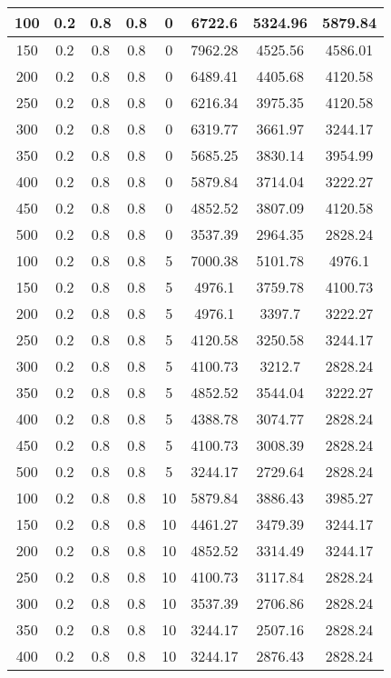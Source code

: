 \documentclass[a4paper, 12pt]{extreport}
\begin{document}
\begin{itemize}
\begin{longtable}{|c|c|c|c|c|c|c|c|}
			100 & 0.2 & 0.8 & 0.8 & 0 & 6722.6 & 5324.96 & 5879.84 \\\hline
			150 & 0.2 & 0.8 & 0.8 & 0 & 7962.28 & 4525.56 & 4586.01 \\\hline
			200 & 0.2 & 0.8 & 0.8 & 0 & 6489.41 & 4405.68 & 4120.58 \\\hline
			250 & 0.2 & 0.8 & 0.8 & 0 & 6216.34 & 3975.35 & 4120.58 \\\hline
			300 & 0.2 & 0.8 & 0.8 & 0 & 6319.77 & 3661.97 & 3244.17 \\\hline
			350 & 0.2 & 0.8 & 0.8 & 0 & 5685.25 & 3830.14 & 3954.99 \\\hline
			400 & 0.2 & 0.8 & 0.8 & 0 & 5879.84 & 3714.04 & 3222.27 \\\hline
			450 & 0.2 & 0.8 & 0.8 & 0 & 4852.52 & 3807.09 & 4120.58 \\\hline
			500 & 0.2 & 0.8 & 0.8 & 0 & 3537.39 & 2964.35 & 2828.24 \\\hline
			100 & 0.2 & 0.8 & 0.8 & 5 & 7000.38 & 5101.78 & 4976.1 \\\hline
			150 & 0.2 & 0.8 & 0.8 & 5 & 4976.1 & 3759.78 & 4100.73 \\\hline
			200 & 0.2 & 0.8 & 0.8 & 5 & 4976.1 & 3397.7 & 3222.27 \\\hline
			250 & 0.2 & 0.8 & 0.8 & 5 & 4120.58 & 3250.58 & 3244.17 \\\hline
			300 & 0.2 & 0.8 & 0.8 & 5 & 4100.73 & 3212.7 & 2828.24 \\\hline
			350 & 0.2 & 0.8 & 0.8 & 5 & 4852.52 & 3544.04 & 3222.27 \\\hline
			400 & 0.2 & 0.8 & 0.8 & 5 & 4388.78 & 3074.77 & 2828.24 \\\hline
			450 & 0.2 & 0.8 & 0.8 & 5 & 4100.73 & 3008.39 & 2828.24 \\\hline
			500 & 0.2 & 0.8 & 0.8 & 5 & 3244.17 & 2729.64 & 2828.24 \\\hline
			100 & 0.2 & 0.8 & 0.8 & 10 & 5879.84 & 3886.43 & 3985.27 \\\hline
			150 & 0.2 & 0.8 & 0.8 & 10 & 4461.27 & 3479.39 & 3244.17 \\\hline
			200 & 0.2 & 0.8 & 0.8 & 10 & 4852.52 & 3314.49 & 3244.17 \\\hline
			250 & 0.2 & 0.8 & 0.8 & 10 & 4100.73 & 3117.84 & 2828.24 \\\hline
			300 & 0.2 & 0.8 & 0.8 & 10 & 3537.39 & 2706.86 & 2828.24 \\\hline
			350 & 0.2 & 0.8 & 0.8 & 10 & 3244.17 & 2507.16 & 2828.24 \\\hline
			400 & 0.2 & 0.8 & 0.8 & 10 & 3244.17 & 2876.43 & 2828.24 \\\hline

\end{longtable}
\end{itemize}
\end{document}
